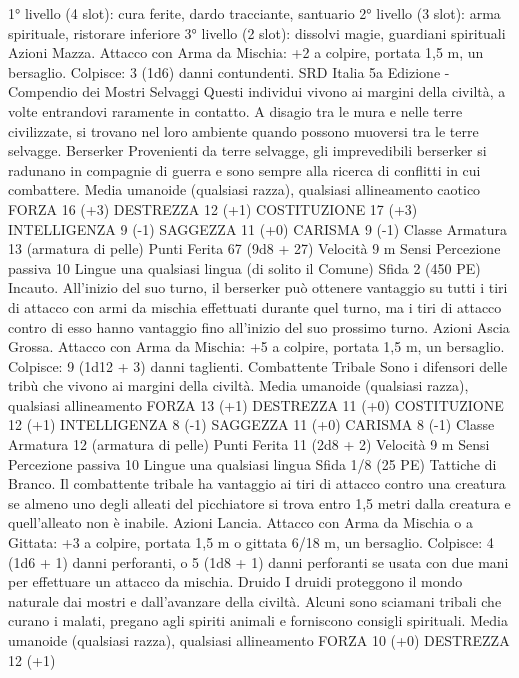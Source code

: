 \begin{multicols}{2}
1° livello (4 slot): cura ferite, dardo tracciante, santuario
2° livello (3 slot): arma spirituale, ristorare inferiore
3° livello (2 slot): dissolvi magie, guardiani spirituali
Azioni
Mazza. Attacco con Arma da Mischia: +2 a colpire, portata 1,5
m, un bersaglio.
Colpisce: 3 (1d6) danni contundenti.
SRD Italia 5a Edizione - Compendio dei Mostri
Selvaggi
Questi individui vivono ai margini della civiltà, a volte
entrandovi raramente in contatto. A disagio tra le mura
e nelle terre civilizzate, si trovano nel loro ambiente
quando possono muoversi tra le terre selvagge.
Berserker
Provenienti da terre selvagge, gli imprevedibili
berserker si radunano in compagnie di guerra e sono
sempre alla ricerca di conflitti in cui combattere.
Media umanoide (qualsiasi razza), qualsiasi allineamento
caotico
FORZA 16 (+3)
DESTREZZA 12 (+1)
COSTITUZIONE 17 (+3)
INTELLIGENZA 9 (-1)
SAGGEZZA 11 (+0)
CARISMA 9 (-1)
Classe Armatura 13 (armatura di pelle)
Punti Ferita 67 (9d8 + 27)
Velocità 9 m
Sensi Percezione passiva 10
Lingue una qualsiasi lingua (di solito il Comune)
Sfida 2 (450 PE)
Incauto. All’inizio del suo turno, il berserker può ottenere
vantaggio su tutti i tiri di attacco con armi da mischia effettuati
durante quel turno, ma i tiri di attacco contro di esso hanno
vantaggio fino all’inizio del suo prossimo turno.
Azioni
Ascia Grossa. Attacco con Arma da Mischia: +5 a colpire,
portata 1,5 m, un bersaglio.
Colpisce: 9 (1d12 + 3) danni taglienti.
Combattente Tribale
Sono i difensori delle tribù che vivono ai margini della
civiltà.
Media umanoide (qualsiasi razza), qualsiasi allineamento
FORZA 13 (+1)
DESTREZZA 11 (+0)
COSTITUZIONE 12 (+1)
INTELLIGENZA 8 (-1)
SAGGEZZA 11 (+0)
CARISMA 8 (-1)
Classe Armatura 12 (armatura di pelle)
Punti Ferita 11 (2d8 + 2)
Velocità 9 m
Sensi Percezione passiva 10
Lingue una qualsiasi lingua
Sfida 1/8 (25 PE)
Tattiche di Branco. Il combattente tribale ha vantaggio ai tiri di
attacco contro una creatura se almeno uno degli alleati del
picchiatore si trova entro 1,5 metri dalla creatura e quell’alleato
non è inabile.
Azioni
Lancia. Attacco con Arma da Mischia o a Gittata: +3 a colpire,
portata 1,5 m o gittata 6/18 m, un bersaglio.
Colpisce: 4 (1d6 + 1) danni perforanti, o 5 (1d8 + 1) danni
perforanti se usata con due mani per effettuare un attacco da
mischia.
Druido
I druidi proteggono il mondo naturale dai mostri e
dall’avanzare della civiltà. Alcuni sono sciamani tribali
che curano i malati, pregano agli spiriti animali e
forniscono consigli spirituali.
Media umanoide (qualsiasi razza), qualsiasi allineamento
FORZA 10 (+0)
DESTREZZA 12 (+1)

\end{multicols}
